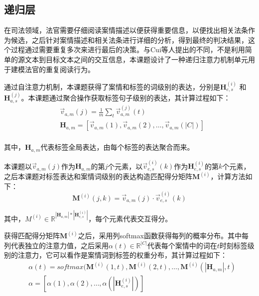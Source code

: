 \subsection{递归层}
在司法领域，法官需要仔细阅读案情描述以便获得重要信息，以便找出相关法条作为候选，之后针对案情描述和相关法条进行详细的分析，得到最终的判决结果，这个过程通过需要重复多次来进行最后的决策。与Cui等人\cite{CuiCWWLH17}提出的不同，不是利用简单的源文本到目标文本之间的交互信息，本课题设计了一种递归注意力机制单元用于建模法官的重复阅读行为。

通过自注意力机制，本课题获得了案情和标签的词级别的表达，分别是$\textbf{H}_{e,s}^{(i)}$ 和 $\textbf{H}_{a,s}^{(j)}$。本课题通过聚合操作获取标签句子级别的表达，其计算过程如下：
\begin{equation}\label{eq:label vector}
    \begin{aligned}
        & \vec{v}_{a,m}(j)=\frac{1}{m}\sum\limits_{t}\vec{v}_{a,m}^{(j)}(t) \\
        & \textbf{H}_{a,m} = [\vec{v}_{a,m}(1), \vec{v}_{a,m}(2), \dots, \vec{v}_{a,m}(|C|)] \\
    \end{aligned}
\end{equation}

其中，$\textbf{H}_{a,m}$代表标签全局表达，由每个标签的表达聚合而来。

本课题以$\vec{v}_{a,m}(j)$作为$\textbf{H}_{a,m}$的第$j$个元素，以$\vec{v}_{e,s}^{(i)}(k)$作为$\textbf{H}_{e,s}^{(i)}$的第$k$个元素，之后本课题对标签表达和案情词级别的表达构造匹配得分矩阵$\textbf{M}^{(i)}$，计算方法如下：
\begin{equation}\label{eq:match score}
    \textbf{M}^{(i)}(j,k) = \vec{v}_{a,m}(j) \cdot \vec{v}_{e,s}^{(i)}(k)
\end{equation}

其中，$M^{(i)} \in \mathbb{R}^{|\textbf{H}_{a,m}|*|\textbf{H}_{e,s}^{(i)}|}$，每个元素代表交互得分。

获得匹配得分矩阵$\textbf{M}^{(i)}$之后，采用列softmax函数获得每列的概率分布。其中每列代表独立的注意力值，之后采用$\alpha(t) \in \mathbb{R}^{|C|}$代表每个案情中的词在$t$时刻标签级别的注意力，它可以看作是案情词到标签的权重分布，其计算过程如下：
\begin{equation}\label{eq:alpha attention}
    \begin{aligned}
        & \alpha(t)=softmax(\textbf{M}^{(i)}(1,t), \textbf{M}^{(i)}(2,t), \dots, \textbf{M}^{(i)}(|\textbf{H}_{a,m}|,t)\\
        & \alpha=[\alpha(1),\alpha(2),\dots,\alpha(|\textbf{H}_{e,s}^{(i)}|)] \\
    \end{aligned}
\end{equation}


